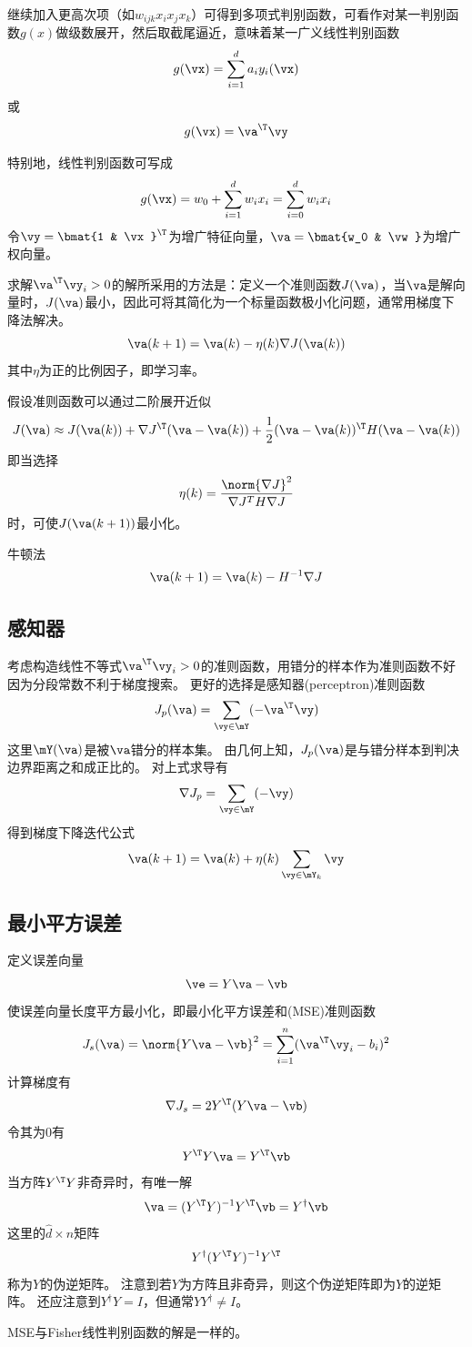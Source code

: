 继续加入更高次项（如$w_{ijk}x_ix_jx_k$）可得到多项式判别函数，可看作对某一判别函数$g(x)$做级数展开，然后取截尾逼近，意味着某一广义线性判别函数
\[g(\vx)=\sum_{i=1}^d a_iy_i(\vx)\]
或
\[g(\vx)=\va^\T\vy\]

特别地，线性判别函数可写成
\[g(\vx)=w_0+\sum_{i=1}^d w_i x_i=\sum_{i=0}^dw_ix_i\]
令$\vy=\bmat{1 & \vx}^\T$为增广特征向量，$\va=\bmat{w_0 & \vw}$为增广权向量。

求解$\va^\T\vy_i>0$的解所采用的方法是：定义一个准则函数$J(\va)$，当$\va$是解向量时，$J(\va)$最小，因此可将其简化为一个标量函数极小化问题，通常用梯度下降法解决。
\[\va(k+1)=\va(k)-\eta(k)\nabla J(\va(k))\]
其中$\eta$为正的比例因子，即学习率。

假设准则函数可以通过二阶展开近似
\[J(\va)\approx J(\va(k))+\nabla J^\T(\va-\va(k))+\frac{1}{2}(\va-\va(k))^\T H(\va-\va(k))\]
即当选择
\[\eta(k)=\frac{\norm{\nabla J}^2}{\nabla J^T H\nabla J}\]
时，可使$J(\va(k+1))$最小化。

牛顿法
\[\va(k+1)=\va(k)-H^{-1}\nabla J\]

\subsection{感知器}
考虑构造线性不等式$\va^\T\vy_i>0$的准则函数，用错分的样本作为准则函数不好因为分段常数不利于梯度搜索。
更好的选择是感知器(perceptron)准则函数
\[J_p(\va)=\sum_{\vy\in\mY}(-\va^\T\vy)\]
这里$\mY(\va)$是被$\va$错分的样本集。
由几何上知，$J_p(\va)$是与错分样本到判决边界距离之和成正比的。
对上式求导有
\[\nabla J_p=\sum_{\vy\in\mY}(-\vy)\]
得到梯度下降迭代公式
\[\va(k+1)=\va(k)+\eta(k)\sum_{\vy\in\mY_k}\vy\]

\subsection{最小平方误差}
定义误差向量
\[\ve=Y\va-\vb\]
使误差向量长度平方最小化，即最小化平方误差和(MSE)准则函数
\[J_s(\va)=\norm{Y\va-\vb}^2=\sum_{i=1}^n(\va^\T\vy_i-b_i)^2\]
计算梯度有
\[\nabla J_s=2Y^\T(Y\va-\vb)\]
令其为$0$有
\[Y^\T Y\va=Y^\T\vb\]
当方阵$Y^\T Y$非奇异时，有唯一解
\[\va=(Y^\T Y)^{-1} Y^\T\vb=Y^\dag\vb\]
这里的$\hat{d}\times n$矩阵
\[Y^\dag (Y^\T Y)^{-1} Y^\T\]
称为$Y$的伪逆矩阵。
注意到若$Y$为方阵且非奇异，则这个伪逆矩阵即为$Y$的逆矩阵。
还应注意到$Y^\dag Y=I$，但通常$YY^\dag\ne I$。

MSE与Fisher线性判别函数的解是一样的。

